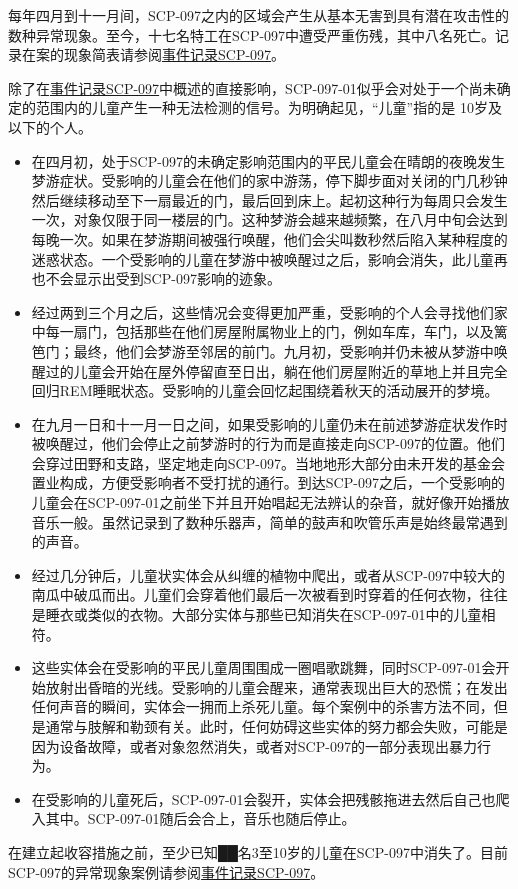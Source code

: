 每年四月到十一月间，SCP-097之内的区域会产生从基本无害到具有潜在攻击性的数种异常现象。至今，十七名特工在SCP-097中遭受严重伤残，其中八名死亡。记录在案的现象简表请参阅\hyperref[sec:DOC-event-log-scp-097]{事件记录SCP-097}。

除了在\hyperref[sec:DOC-event-log-scp-097]{事件记录SCP-097}中概述的直接影响，SCP-097-01似乎会对处于一个尚未确定的范围内的儿童产生一种无法检测的信号。为明确起见，“儿童”指的是 10岁及以下的个人。

\begin{itemize}
\item 在四月初，处于SCP-097的未确定影响范围内的平民儿童会在晴朗的夜晚发生梦游症状。受影响的儿童会在他们的家中游荡，停下脚步面对关闭的门几秒钟然后继续移动至下一扇最近的门，最后回到床上。起初这种行为每周只会发生一次，对象仅限于同一楼层的门。这种梦游会越来越频繁，在八月中旬会达到每晚一次。如果在梦游期间被强行唤醒，他们会尖叫数秒然后陷入某种程度的迷惑状态。一个受影响的儿童在梦游中被唤醒过之后，影响会消失，此儿童再也不会显示出受到SCP-097影响的迹象。
\item 经过两到三个月之后，这些情况会变得更加严重，受影响的个人会寻找他们家中每一扇门，包括那些在他们房屋附属物业上的门，例如车库，车门，以及篱笆门；最终，他们会梦游至邻居的前门。九月初，受影响并仍未被从梦游中唤醒过的儿童会开始在屋外停留直至日出，躺在他们房屋附近的草地上并且完全回归REM睡眠状态。受影响的儿童会回忆起围绕着秋天的活动展开的梦境。
\item 在九月一日和十一月一日之间，如果受影响的儿童仍未在前述梦游症状发作时被唤醒过，他们会停止之前梦游时的行为而是直接走向SCP-097的位置。他们会穿过田野和支路，坚定地走向SCP-097。当地地形大部分由未开发的基金会置业构成，方便受影响者不受打扰的通行。到达SCP-097之后，一个受影响的儿童会在SCP-097-01之前坐下并且开始唱起无法辨认的杂音，就好像开始播放音乐一般。虽然记录到了数种乐器声，简单的鼓声和吹管乐声是始终最常遇到的声音。
\item 经过几分钟后，儿童状实体会从纠缠的植物中爬出，或者从SCP-097中较大的南瓜中破瓜而出。儿童们会穿着他们最后一次被看到时穿着的任何衣物，往往是睡衣或类似的衣物。大部分实体与那些已知消失在SCP-097-01中的儿童相符。
\item 这些实体会在受影响的平民儿童周围围成一圈唱歌跳舞，同时SCP-097-01会开始放射出昏暗的光线。受影响的儿童会醒来，通常表现出巨大的恐慌；在发出任何声音的瞬间，实体会一拥而上杀死儿童。每个案例中的杀害方法不同，但是通常与肢解和勒颈有关。此时，任何妨碍这些实体的努力都会失败，可能是因为设备故障，或者对象忽然消失，或者对SCP-097的一部分表现出暴力行为。
\item 在受影响的儿童死后，SCP-097-01会裂开，实体会把残骸拖进去然后自己也爬入其中。SCP-097-01随后会合上，音乐也随后停止。
\end{itemize}

在建立起收容措施之前，至少已知██名3至10岁的儿童在SCP-097中消失了。目前SCP-097的异常现象案例请参阅\hyperref[sec:DOC-event-log-scp-097]{事件记录SCP-097}。


